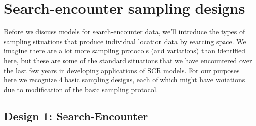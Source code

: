\section{Search-encounter sampling designs}

Before we discuss models for search-encounter data, we'll introduce
the types of sampling situations that produce individual location data
by searcing space.  We imagine there are a lot more sampling protocols
(and variations) than identified here, but these are some of the
standard situations that we have encountered over the last few years
in developing applications of SCR models.  For our purposes here we
recognize 4 basic sampling designs, each of which might have
variations due to modification of the basic sampling protocol.


\subsection{Design 1: Search-Encounter}
\label{searchencounter.sec.fixedpath}

